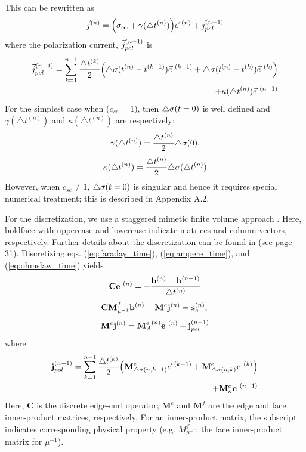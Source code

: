 This can be rewritten as
\begin{equation}
  {\vec j}^{(n)} = \Big(\sigma_\infty + \gamma (\triangle t^{(n)})\Big){\vec e}^{\ (n)} + {\vec j}_{pol}^{(n-1)}
  \label{eq:ohmslaw_time}
\end{equation}
where the polarization current, ${\vec j}_{pol}^{(n-1)}$ is
\begin{align}
  {\vec j}_{pol}^{(n-1)} = \sum_{k=1}^{n-1} \frac{\triangle t^{(k)}}{2} \Big(\triangle\sigma (t^{(n)} - t^{(k-1)}) {\vec e}^{\ (k-1)} + \triangle\sigma (t^{(n)} - t^{(k)}) {\vec e}^{\ (k)} \Big) \nonumber \\
  +  \kappa(\triangle t^{(n)}) {\vec e}^{\ (n-1)}
\end{align}
For the simplest case when ($c_{se}=1$), then $\triangle\sigma(t=0)$  is well defined and  $\gamma (\triangle t^{(n)})$ and $\kappa (\triangle t^{(n)})$ are respectively:
\begin{equation}
  \gamma(\triangle t^{(n)}) = \frac{\triangle t^{(n)}}{2}\triangle\sigma (0),
\end{equation}
\begin{equation}
  \kappa(\triangle t^{(n)}) = \frac{\triangle t^{(n)}}{2} \triangle\sigma (\triangle t^{(n)})
\end{equation}
However, when $c_{se}\neq1$, $\triangle\sigma(t=0)$ is singular and hence it requires special numerical treatment; this is described in Appendix A.2.

For the discretization, we use a staggered mimetic finite volume approach \cite[]{hyman2002}. Here, boldface with uppercase and lowercase indicate matrices and column vectors, respectively. Further details about the discretization can be found in \cite{haber_book} (see page 31).
Discretizing eqs. (\ref{eq:faraday_time}), (\ref{eq:ampere_time}), and (\ref{eq:ohmslaw_time}) yields
\begin{equation}
  {\mathbf C} {\mathbf{e} }^{\ (n)} = -\frac{{\mathbf{b} }^{(n)}-{\mathbf{b} }^{(n-1)}}{\triangle t^{(n)}}
    \label{eq:faraday_discrete}
\end{equation}
\begin{equation}
  {\mathbf C} {{\mathbf M}^f_{\mu^{-1}}} {\mathbf{b} }^{(n)} - {{\mathbf M}^e} {\mathbf{j} }^{(n)} = \mathbf{s}_e^{(n)}, \\
  \label{eq:ampere_discrete}
\end{equation}
\begin{equation}
  {{\mathbf M}^e}{\mathbf{j} }^{(n)} = {{\mathbf M}^e_{A}}^{(n)}{\mathbf{e} }^{\ (n)} + {\mathbf{j} }_{pol}^{(n-1)}
  \label{eq:ohmslaw_discrete}
\end{equation}
where
\begin{align}
  {\mathbf{j} }_{pol}^{(n-1)} = \sum_{k=1}^{n-1} \frac{\triangle t^{(k)}}{2} \Big({{\mathbf M}^e_{\triangle\sigma (n, k-1)}} {\vec e}^{\ (k-1)} + {{\mathbf M}^e_{\triangle\sigma (n, k)}} {\mathbf{e} }^{\ (k)} \Big) \nonumber \\
  +  {{\mathbf M}^e_{\kappa}} {\mathbf{e} }^{\ (n-1)}
\end{align}
Here, $\mathbf{C}$ is the discrete edge-curl operator; $\mathbf{M}^e$ and $\mathbf{M}^f$ are the edge and face inner-product matrices, respectively. For an inner-product matrix, the subscript indicates corresponding physical property (e.g. $M^{f}_{\mu^{-1}}$: the face inner-product matrix for $\mu^{-1}$).

